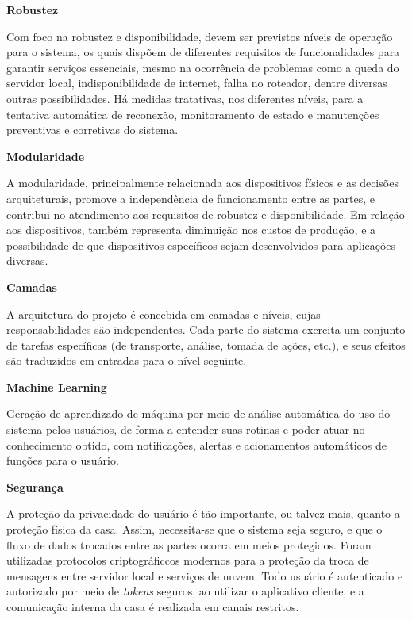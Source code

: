 \begin{description}
\item \textbf{Robustez}

Com foco na robustez e disponibilidade, devem ser previstos níveis de operação para o sistema, os quais dispõem de diferentes requisitos de funcionalidades para garantir serviços essenciais, mesmo na ocorrência de problemas como a queda do servidor local, indisponibilidade de internet, falha no roteador, dentre diversas outras possibilidades. Há medidas tratativas, nos diferentes níveis, para a tentativa automática de reconexão, monitoramento de estado e manutenções preventivas e corretivas do sistema.

\item \textbf{Modularidade}

A modularidade, principalmente relacionada aos dispositivos físicos e as decisões arquiteturais, promove a independência de funcionamento entre as partes, e contribui no atendimento aos requisitos de robustez e disponibilidade. Em relação aos dispositivos, também representa diminuição nos custos de produção, e a possibilidade de que dispositivos específicos sejam desenvolvidos para aplicações diversas.

\item \textbf{Camadas}

A arquitetura do projeto é concebida em camadas e níveis, cujas responsabilidades são independentes. Cada parte do sistema exercita um conjunto de tarefas específicas (de transporte, análise, tomada de ações, etc.), e seus efeitos são traduzidos em entradas para o nível seguinte.

\item \textbf{Machine Learning}

Geração de aprendizado de máquina por meio de análise automática do uso do sistema pelos usuários, de forma a entender suas rotinas e poder atuar no conhecimento obtido, com notificações, alertas e acionamentos automáticos de funções para o usuário.

\item \textbf{Segurança}

A proteção da privacidade do usuário é tão importante, ou talvez mais, quanto a proteção física da casa. Assim, necessita-se que o sistema seja seguro, e que o fluxo de dados trocados entre as partes ocorra em meios protegidos. Foram utilizadas protocolos criptográficcos modernos para a proteção da troca de mensagens entre servidor local e serviços de nuvem. Todo usuário é autenticado e autorizado por meio de \emph{tokens} seguros, ao utilizar o aplicativo cliente, e a comunicação interna da casa é realizada em canais restritos.

\end{description}

